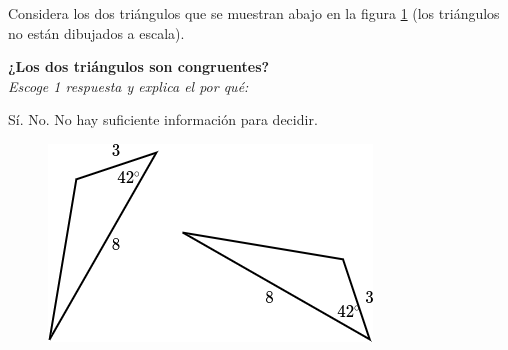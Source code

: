 Considera los dos triángulos que se muestran abajo en la figura \ref{fig:20230323154930} (los triángulos no están dibujados a escala).

\begin{minipage}{0.6\textwidth}
    \textbf{¿Los dos triángulos son congruentes?}\\
    \emph{Escoge 1 respuesta y explica el por qué:}\\

    \begin{choices}
        \CorrectChoice Sí.
        \choice No.
        \choice No hay suficiente información para decidir.
    \end{choices}
    \vspace{2cm}
\end{minipage}%
\begin{minipage}{0.3\textwidth}
    \begin{figure}[H]
        \centering
        \includegraphics[width=\linewidth]{../images/20230323154930}
        \caption{}
        \label{fig:20230323154930}
    \end{figure}
\end{minipage}

